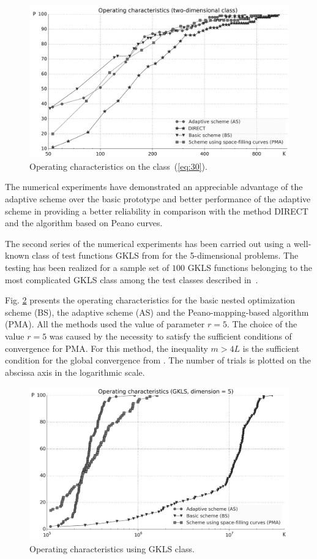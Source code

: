 \documentclass[smallextended]{svjour3}
\let\origref\ref
\renewcommand{\ref}[1]{(\origref{#1})}
\begin{document}
\begin{figure}[H]
\includegraphics[width=120mm]{Fig3.png}
\caption{\label{fig:3}Operating characteristics on the class~\ref{eq:30}.}
\end{figure}

The numerical experiments have demonstrated an appreciable advantage of the adaptive scheme over the basic prototype and better performance of the adaptive scheme in providing a better reliability in comparison with the method DIRECT and the algorithm based on Peano curves.

The second series of the numerical experiments has been carried out using a well-known class of test functions GKLS from \cite{Ref6} for the 5-dimensional problems. The testing has been realized for a sample set of $100$ GKLS functions belonging to the most complicated GKLS class among the test classes described in~\cite{Ref6}.

Fig. \origref{fig:4} presents the operating characteristics for the basic nested optimization scheme (BS), the adaptive scheme (AS) and the Peano-mapping-based algorithm (PMA). All the methods used the value of parameter $r = 5$. The choice of the value $r = 5$ was caused by the necessity to satisfy the sufficient conditions of convergence for PMA. For this method, the inequality $m > 4L$ is the sufficient condition for the global convergence from \cite{Ref32}. The number of trials is plotted on the abscissa axis in the logarithmic scale.
\begin{figure}[H]
\includegraphics[width=116mm]{Fig4.png}
\caption{\label{fig:4}Operating characteristics using GKLS class.}
\end{figure}
\end{document}
